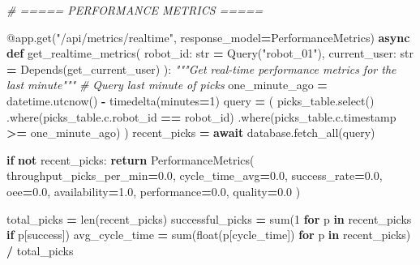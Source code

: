 \documentclass[
]{article}
\newenvironment{Shaded}{\begin{snugshade}}{\end{snugshade}}
\newcommand{\AttributeTok}[1]{\textcolor[rgb]{0.13,0.29,0.53}{#1}}
\newcommand{\BuiltInTok}[1]{#1}
\newcommand{\CommentTok}[1]{\textcolor[rgb]{0.56,0.35,0.01}{\textit{#1}}}
\newcommand{\ControlFlowTok}[1]{\textcolor[rgb]{0.13,0.29,0.53}{\textbf{#1}}}
\newcommand{\DecValTok}[1]{\textcolor[rgb]{0.00,0.00,0.81}{#1}}
\newcommand{\FloatTok}[1]{\textcolor[rgb]{0.00,0.00,0.81}{#1}}
\newcommand{\KeywordTok}[1]{\textcolor[rgb]{0.13,0.29,0.53}{\textbf{#1}}}
\newcommand{\NormalTok}[1]{#1}
\newcommand{\OperatorTok}[1]{\textcolor[rgb]{0.81,0.36,0.00}{\textbf{#1}}}
\newcommand{\StringTok}[1]{\textcolor[rgb]{0.31,0.60,0.02}{#1}}
\begin{document}
\begin{Shaded}
\begin{Highlighting}[]
\CommentTok{\# ===== PERFORMANCE METRICS =====}

\AttributeTok{@app.get}\NormalTok{(}\StringTok{"/api/metrics/realtime"}\NormalTok{, response\_model}\OperatorTok{=}\NormalTok{PerformanceMetrics)}
\ControlFlowTok{async} \KeywordTok{def}\NormalTok{ get\_realtime\_metrics(}
\NormalTok{    robot\_id: }\BuiltInTok{str} \OperatorTok{=}\NormalTok{ Query(}\StringTok{"robot\_01"}\NormalTok{),}
\NormalTok{    current\_user: }\BuiltInTok{str} \OperatorTok{=}\NormalTok{ Depends(get\_current\_user)}
\NormalTok{):}
    \CommentTok{"""Get real{-}time performance metrics for the last minute"""}
    \CommentTok{\# Query last minute of picks}
\NormalTok{    one\_minute\_ago }\OperatorTok{=}\NormalTok{ datetime.utcnow() }\OperatorTok{{-}}\NormalTok{ timedelta(minutes}\OperatorTok{=}\DecValTok{1}\NormalTok{)}
\NormalTok{    query }\OperatorTok{=}\NormalTok{ (}
\NormalTok{        picks\_table.select()}
\NormalTok{        .where(picks\_table.c.robot\_id }\OperatorTok{==}\NormalTok{ robot\_id)}
\NormalTok{        .where(picks\_table.c.timestamp }\OperatorTok{\textgreater{}=}\NormalTok{ one\_minute\_ago)}
\NormalTok{    )}
\NormalTok{    recent\_picks }\OperatorTok{=} \ControlFlowTok{await}\NormalTok{ database.fetch\_all(query)}

    \ControlFlowTok{if} \KeywordTok{not}\NormalTok{ recent\_picks:}
        \ControlFlowTok{return}\NormalTok{ PerformanceMetrics(}
\NormalTok{            throughput\_picks\_per\_min}\OperatorTok{=}\FloatTok{0.0}\NormalTok{,}
\NormalTok{            cycle\_time\_avg}\OperatorTok{=}\FloatTok{0.0}\NormalTok{,}
\NormalTok{            success\_rate}\OperatorTok{=}\FloatTok{0.0}\NormalTok{,}
\NormalTok{            oee}\OperatorTok{=}\FloatTok{0.0}\NormalTok{,}
\NormalTok{            availability}\OperatorTok{=}\FloatTok{1.0}\NormalTok{,}
\NormalTok{            performance}\OperatorTok{=}\FloatTok{0.0}\NormalTok{,}
\NormalTok{            quality}\OperatorTok{=}\FloatTok{0.0}
\NormalTok{        )}

\NormalTok{    total\_picks }\OperatorTok{=} \BuiltInTok{len}\NormalTok{(recent\_picks)}
\NormalTok{    successful\_picks }\OperatorTok{=} \BuiltInTok{sum}\NormalTok{(}\DecValTok{1} \ControlFlowTok{for}\NormalTok{ p }\KeywordTok{in}\NormalTok{ recent\_picks }\ControlFlowTok{if}\NormalTok{ p[}\StringTok{\textquotesingle{}success\textquotesingle{}}\NormalTok{])}
\NormalTok{    avg\_cycle\_time }\OperatorTok{=} \BuiltInTok{sum}\NormalTok{(}\BuiltInTok{float}\NormalTok{(p[}\StringTok{\textquotesingle{}cycle\_time\textquotesingle{}}\NormalTok{]) }\ControlFlowTok{for}\NormalTok{ p }\KeywordTok{in}\NormalTok{ recent\_picks) }\OperatorTok{/}\NormalTok{ total\_picks}


\end{Highlighting}
\end{Shaded}
\end{document}
